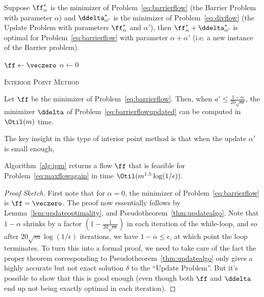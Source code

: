\begin{lemma}
  \label{lem:updateoptimality}
  Suppose $\ff^*_{\alpha}$ is the minimizer of Problem~\eqref{eq:barrierflow}
  (the Barrier Problem with parameter $\alpha$) and
  $\ddelta^*_{\alpha'}$ is the minimizer of Problem~\eqref{eq:divflow} (the
  Update Problem with parameters $\ff^*_{\alpha}$ and $\alpha'$),
  then $\ff^*_{\alpha} + \ddelta^*_{\alpha'}$ is optimal for Problem~\eqref{eq:barrierflow} 
  with parameter $\alpha+\alpha'$ (i.e. a new instance of the Barrier
  problem).
\end{lemma}



\begin{algorithm}[H]
  \SetAlgoLined
  $\ff \leftarrow \veczero$\;
  $\alpha \leftarrow 0$\;
  \Return{\ff}
  \caption{\textsc{Interior Point Method}}
  \label{alg:ipm}
\end{algorithm}

\begin{pseudotheorem}
  \label{thm:updatealgo}
  Let $\ff$ be the minimizer of Problem~\eqref{eq:barrierflow}.
  Then, when  $a' \leq \frac{1-\alpha}{20\sqrt{m}}$, the minimizer
  $\ddelta$ of Problem~\eqref{eq:barrierflowupdated} can be computed
  in $\Otil(m)$ time.
\end{pseudotheorem}

The key insight in this type of interior point method is that when the
update $\alpha'$ is small enough, 
\begin{theorem}\label{thm:maxflowipm}
  Algorithm~\ref{alg:ipm} returns a flow $\ff$ that is feasible for
  Problem~\eqref{eq:maxflowagain} in time $\Otil(m^{1.5}\log(1/\epsilon))$.
\end{theorem}

\begin{proof}[Proof Sketch]
  First note that for $\alpha = 0$, the minimizer of
  Problem~\eqref{eq:barrierflow} is $\ff = \veczero$.
  The proof now essentially follows by
  Lemma~\eqref{lem:updateoptimality}, and
  Pseudotheorem~\ref{thm:updatealgo}.
  Note that $1-\alpha$ shrinks by a factor $(1-\frac{1}{20\sqrt{m}})$
    in each iteration of the while-loop, and so after
    $20\sqrt{m}\log(1/\epsilon)$ iterations, we have $1-\alpha \leq
    \epsilon$, at which point the loop terminates.
   To turn this into a formal proof, we need to take care of the fact
   the proper theorem corresponding to 
   Pseudotheorem~\ref{thm:updatealgo} only gives a highly accurate
   but not exact solution $\delta$ to the ``Update Problem''.
   But it's possible to show that this is good enough (even though
   both $\ff$ and $\ddelta$ end up not being exactly optimal in each iteration).
\end{proof}

